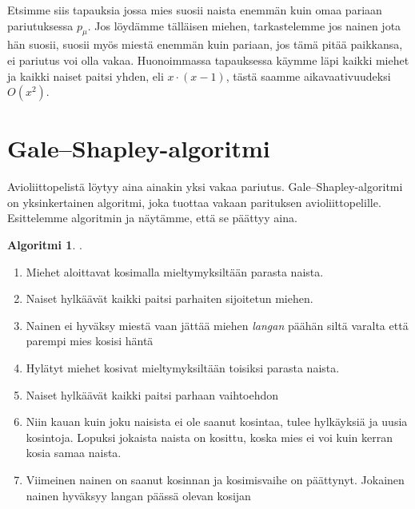\documentclass[finnish]{tktltiki2}
\theoremstyle{definition}
\newtheorem{alg}[lau]{Algoritmi}
\theoremstyle{remark}
\begin{document}
Etsimme siis tapauksia jossa mies suosii naista enemmän kuin omaa pariaan pariutuksessa $p_\mu$.
Jos löydämme tälläisen miehen, tarkastelemme jos nainen jota hän suosii, suosii myös miestä enemmän kuin pariaan, jos tämä pitää paikkansa, ei pariutus voi olla vakaa.
Huonoimmassa tapauksessa käymme läpi kaikki miehet ja kaikki naiset paitsi yhden, eli $x\cdot(x-1)$, tästä saamme aikavaativuudeksi $O(x^2)$.

\section{Gale--Shapley-algoritmi}
Avioliittopelistä löytyy aina ainakin yksi vakaa pariutus. Gale--Shapley-algoritmi on yksinkertainen algoritmi, joka tuottaa vakaan parituksen avioliittopelille. Esittelemme algoritmin ja näytämme, että se päättyy aina.
\begin{alg} \cite[p. 13]{gale62a} \label{gsalg}.
\begin{enumerate}
	\item Miehet aloittavat kosimalla mieltymyksiltään parasta naista.
	\item Naiset hylkäävät kaikki paitsi parhaiten sijoitetun miehen.
	\item Nainen ei hyväksy miestä vaan jättää miehen \emph{langan} päähän siltä varalta että parempi mies kosisi häntä
	\item Hylätyt miehet kosivat mieltymyksiltään toisiksi parasta naista.
	\item Naiset hylkäävät kaikki paitsi parhaan vaihtoehdon
	\item Niin kauan kuin joku naisista ei ole saanut kosintaa, tulee hylkäyksiä ja uusia kosintoja. Lopuksi jokaista naista on kosittu, koska mies ei voi kuin kerran kosia samaa naista.
	\item Viimeinen nainen on saanut kosinnan ja kosimisvaihe on päättynyt. Jokainen nainen hyväksyy langan päässä olevan kosijan
\end{enumerate}
\end{alg}
\end{document}
